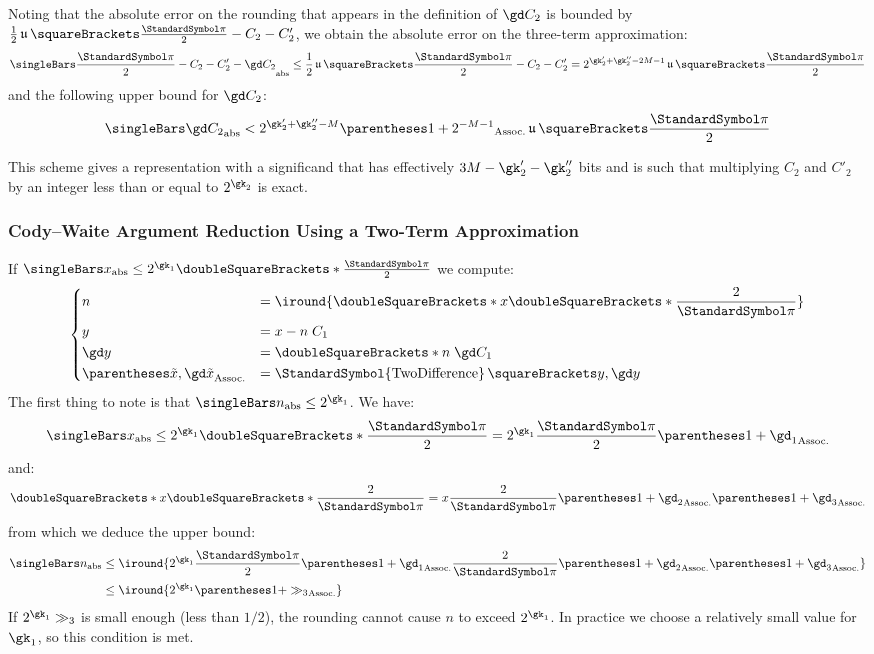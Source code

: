 \documentclass[10pt, a4paper, twoside]{basestyle}
\DeclareMathOperator{\ULP}{\mathfrak u}
\DeclareMathOperator{\twodifference}{\StandardSymbol{TwoDifference}}
\newcommand{\round}[1]{\doubleSquareBrackets*{#1}}
\newcommand{\red}[1]{\tilde{#1}}
\begin{document}
Noting that the absolute error on the rounding that appears in the definition of $\gd C_2$ is bounded by $\frac{1}{2} \ULP\of{\frac{\Pi}{2} - C_2 - C'_2}$, we obtain the absolute error on the three-term approximation:
\begin{align}
\abs{\frac{\Pi}{2} - C_2 - C'_2 - \gd C_2} \leq \frac{1}{2} \ULP\of{\frac{\Pi}{2} - C_2 - C'_2} = 2^{\gk'_2 + \gk''_2 - 2 M - 1} \ULP\of{\frac{\Pi}{2}}
\label{eqnpithreeterms}
\end{align}
and the following upper bound for $\gd C_2$:
\begin{equation}
\abs{\gd C_2} < 2^{\gk'_2 + \gk''_2 - M} \pa{1 + 2^{-M - 1}} \ULP\of{\frac{\Pi}{2}}
\label{eqnabsdc2}
\end{equation}
 
This scheme gives a representation with a significand that has effectively $3 M - \gk'_2 - \gk''_2$ bits and is such that multiplying $C_2$ and $C'_2$ by an integer less than or equal to $2^{\gk_2}$ is exact.

\subsubsection*{Cody--Waite Argument Reduction Using a Two-Term Approximation}

If $\abs x \leq 2^{\gk_1} \round{\frac{\Pi}{2}}$ we compute:
\[
\begin{dcases}
n &= \iround{\round{x \round{\frac{2}{\Pi}}}} \\
y &= x - n \; C_1 \\
\gd y &= \round{n \; \gd C_1} \\
\pa{\red x, \gd \red x} &= \twodifference\of{y, \gd y}
\end{dcases}
\]
The first thing to note is that $\abs n \leq 2^{\gk_1}$.  We have:
\[
\abs x \leq 2^{\gk_1} \round{\frac{\Pi}{2}} = 2^{\gk_1} \frac{\Pi}{2} \pa{1 + \gd_1} 
\]
and:
\begin{equation}
\round{x \round{\frac{2}{\Pi}}} = x \frac{2}{\Pi} \pa{1 + \gd_2}\pa{1 + \gd_3}
\label{eqnxerror}
\end{equation}
from which we deduce the upper bound:
\begin{align*}
\abs n &\leq \iround{2^{\gk_1} \frac{\Pi}{2} \pa{1 + \gd_1} \frac{2}{\Pi} \pa{1 + \gd_2} \pa{1 + \gd_3}} \\
&\leq \iround{2^{\gk_1} \pa{1 + \gg_3}}
\end{align*}
If $2^{\gk_1} \gg_3$ is small enough (less than $1/2$), the rounding cannot cause $n$ to exceed $2^{\gk_1}$.  In practice we choose a relatively small value for $\gk_1$, so this condition is met.
\end{document}
